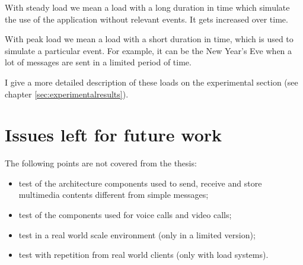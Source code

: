 With steady load we mean a load with a long duration in time which simulate the use of the application without relevant events.
It gets increased over time.

With peak load we mean a load with a short duration in time, which is used to simulate a particular event. For example, it can be the New Year's Eve when a lot of messages are sent in a limited period of time.

I give a more detailed description of these loads on the experimental section (see chapter \vref{sec:experimentalresults}).

\section{Issues left for future work\label{sec:uncovered}}

The following points are not covered from the thesis:
\begin{itemize}
    \item test of the architecture components used to send, receive and store multimedia contents different from simple messages;
    \item test of the components used for voice calls and video calls;
    \item test in a real world scale environment (only in a limited version);
    \item test with repetition from real world clients (only with load systems).
\end{itemize}
